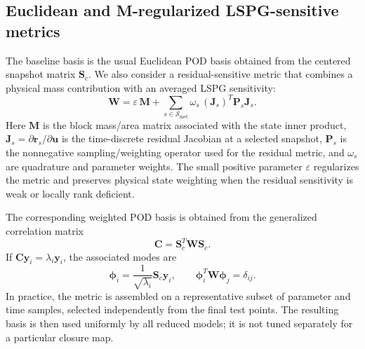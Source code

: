 \documentclass[11pt]{article}
\begin{document}
\subsection{Euclidean and M-regularized LSPG-sensitive metrics}
The baseline basis is the usual Euclidean POD basis obtained from the centered
snapshot matrix $\mathbf S_c$. We also consider a residual-sensitive metric
that combines a physical mass contribution with an averaged LSPG sensitivity:
\begin{equation}
\mathbf W
=
\varepsilon\,\mathbf M
+
\sum_{s\in\mathcal S_{\mathrm{met}}}
\omega_s\,
(\mathbf J_s)^T\mathbf P_s\mathbf J_s .
\label{eq:mlspg-metric}
\end{equation}
Here $\mathbf M$ is the block mass/area matrix associated with the state
inner product, $\mathbf J_s=\partial\mathbf r_s/\partial\mathbf u$ is the
time-discrete residual Jacobian at a selected snapshot, $\mathbf P_s$ is the
nonnegative sampling/weighting operator used for the residual metric, and
$\omega_s$ are quadrature and parameter weights. The small positive parameter
$\varepsilon$ regularizes the metric and preserves physical state weighting
when the residual sensitivity is weak or locally rank deficient.

The corresponding weighted POD basis is obtained from the generalized
correlation matrix
\begin{equation}
\mathbf C
=
\mathbf S_c^T\mathbf W\mathbf S_c .
\label{eq:mlspg-correlation}
\end{equation}
If $\mathbf C\mathbf y_i=\lambda_i\mathbf y_i$, the associated
modes are
\begin{equation}
\bm\phi_i
=
\frac{1}{\sqrt{\lambda_i}}\mathbf S_c\mathbf y_i,
\qquad
\bm\phi_i^T\mathbf W\bm\phi_j=\delta_{ij}.
\label{eq:weighted-pod-modes}
\end{equation}
In practice, the metric is assembled on a representative subset of parameter
and time samples, selected independently from the final test points. The
resulting basis is then used uniformly by all reduced models; it is not tuned
separately for a particular closure map.
\end{document}
